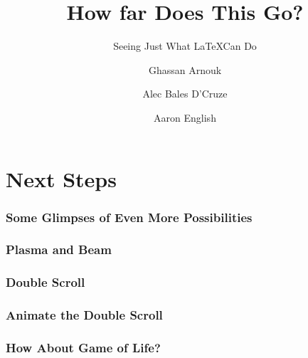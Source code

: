 \documentclass{beamer}
\title{How far Does This Go?}
\subtitle{Seeing Just What \LaTeX Can Do}
\date{\DTMusedate{presentation}}
\author{Ghassan Arnouk \and
        Alec Bales D'Cruze \and
        Aaron English
}
\begin{document}
    \begin{frame}
        \titlepage
    \end{frame}
    \section{Next Steps}\label{sct:allRes}
        \begin{frame}
        \frametitle{Some Glimpses of Even More Possibilities}
        \end{frame}
        \begin{frame}
            \frametitle{ Plasma and Beam}
        \end{frame}
        \begin{frame}
            \frametitle{Double Scroll}
        \end{frame}
        \begin{frame}
            \frametitle{Animate the Double Scroll}
        \end{frame}
        \begin{frame}
            \frametitle{How About Game of Life?}
        \end{frame}
\end{document}
